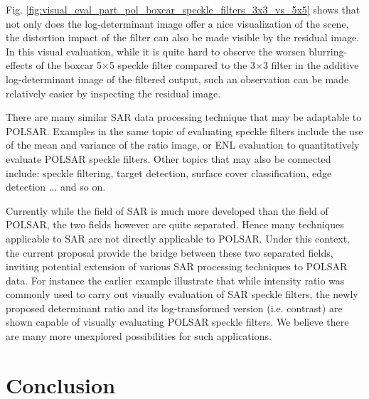 \documentclass[journal]{IEEEtran}
\begin{document}
Fig. \ref{fig:visual_eval_part_pol_boxcar_speckle_filters_3x3_vs_5x5} shows that not only does the log-determinant image offer a nice visualization of the scene, 
  the distortion impact of the filter can also be made visible by the residual image.
In this visual evaluation, while it is quite hard to observe the worsen blurring-effects of the boxcar 5$\times$5 speckle filter compared to the 3$\times$3 filter
in the additive log-determinant image of the filtered output, 
  such an observation can be made relatively easier by inspecting the residual image.
  

There are many similar SAR data processing technique that may be adaptable to POLSAR.
Examples in the same topic of evaluating speckle filters include
  the use of the mean and variance of the ratio image, or ENL evaluation to quantitatively evaluate POLSAR speckle filters.
Other topics that may also be connected include: speckle filtering, target detection, surface cover classification, edge detection ... and so on.

Currently while the field of SAR is much more developed than the field of POLSAR,
  the two fields however are quite separated.
Hence many techniques applicable to SAR are not directly applicable to POLSAR.
Under this context, the current proposal provide the bridge between these two separated fields,
  inviting potential extension of various SAR processing techniques to POLSAR data.
For instance the earlier example illustrate that while intensity ratio was commonly used to carry out visually evaluation of SAR speckle filters,
  the newly proposed determinant ratio and its log-transformed version (i.e. contrast) are shown capable of visually evaluating POLSAR speckle filters.
We believe there are many more unexplored possibilities for such applications.
  
\section{Conclusion}
\label{sec:conclusion}
\end{document}

